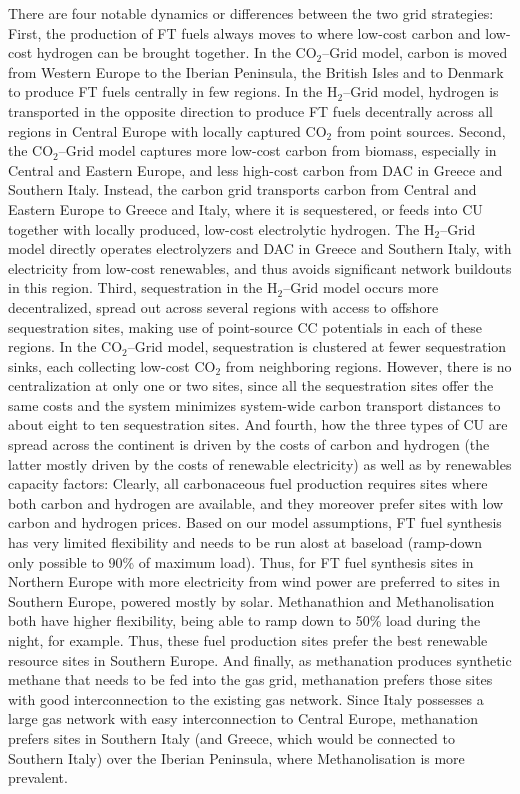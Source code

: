 \documentclass[twocolumn]{article}
\newcommand{\carbon}{CO$_2$}
\newcommand{\hydrogen}{H$_2$}
\newcommand{\carbongrid}{\carbon{}--Grid}
\newcommand{\hydrogengrid}{\hydrogen{}--Grid}
\begin{document}
There are four notable dynamics or differences between the two grid strategies: 
First, the production of FT fuels always moves to where low-cost carbon and low-cost hydrogen can be brought together. In the \carbongrid{} model, carbon is moved from Western Europe to the Iberian Peninsula, the British Isles and to Denmark to produce FT fuels centrally in few regions. In the \hydrogengrid{} model, hydrogen is transported in the opposite direction to produce FT fuels decentrally across all regions in Central Europe with locally captured \carbon{} from point sources.
Second, the \carbongrid{} model captures more low-cost carbon from biomass, especially in Central and Eastern Europe, and less high-cost carbon from DAC in Greece and Southern Italy. Instead, the carbon grid transports carbon from Central and Eastern Europe to Greece and Italy, where it is sequestered, or feeds into CU together with locally produced, low-cost electrolytic hydrogen. The \hydrogengrid{} model directly operates electrolyzers and DAC in Greece and Southern Italy, with electricity from low-cost renewables, and thus avoids significant network buildouts in this region.
Third, sequestration in the \hydrogengrid{} model occurs more decentralized, spread out across several regions with access to offshore sequestration sites, making use of point-source CC potentials in each of these regions. In the \carbongrid{} model, sequestration is clustered at fewer sequestration sinks, each collecting low-cost \carbon{} from neighboring regions. However, there is no centralization at only one or two sites, since all the sequestration sites offer the same costs and the system minimizes system-wide carbon transport distances to about eight to ten sequestration sites.
And fourth, how the three types of CU are spread across the continent is driven by the costs of carbon and hydrogen (the latter mostly driven by the costs of renewable electricity) as well as by renewables capacity factors: Clearly, all carbonaceous fuel production requires sites where both carbon and hydrogen are available, and they moreover prefer sites with low carbon and hydrogen prices. Based on our model assumptions, FT fuel synthesis has very limited flexibility and needs to be run alost at baseload (ramp-down only possible to 90\% of maximum load). Thus, for FT fuel synthesis sites in Northern Europe with more electricity from wind power are preferred to sites in Southern Europe, powered mostly by solar. Methanathion and Methanolisation both have higher flexibility, being able to ramp down to 50\% load during the night, for example. Thus, these fuel production sites prefer the best renewable resource sites in Southern Europe. And finally, as methanation produces synthetic methane that needs to be fed into the gas grid, methanation prefers those sites with good interconnection to the existing gas network. Since Italy possesses a large gas network with easy interconnection to Central Europe, methanation prefers sites in Southern Italy (and Greece, which would be connected to Southern Italy) over the Iberian Peninsula, where Methanolisation is more prevalent.
\end{document}
